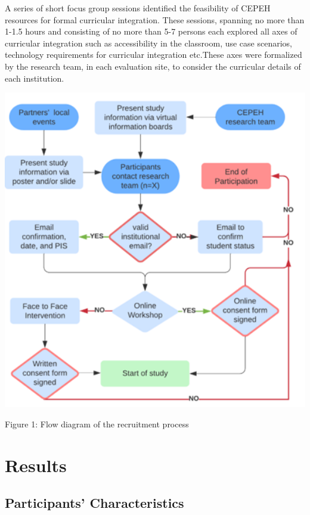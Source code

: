 \documentclass[a4paper, nobind]{templates/ociamthesis}
\begin{document}
A series of short focus group sessions identified the feasibility of CEPEH resources for formal curricular integration. These sessions, spanning no more than 1-1.5 hours and consisting of no more than 5-7 persons each explored all axes of curricular integration such as accessibility in the classroom, use case scenarios, technology requirements for curricular integration etc.These axes were formalized by the research team, in each evaluation site, to consider the curricular details of each institution.

\includegraphics[width=5.76in]{untitled-1}

Figure 1: Flow diagram of the recruitment process

\hypertarget{rmd-basics}{%
\chapter{Results}\label{rmd-basics}}

\minitoc 

\noindent

\hypertarget{participants-characteristics}{%
\section{Participants' Characteristics}\label{participants-characteristics}}
\end{document}
